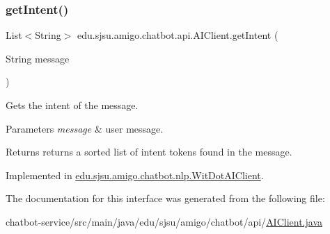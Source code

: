 \subsubsection{\texorpdfstring{get\+Intent()}{getIntent()}}
{\footnotesize\ttfamily List$<$String$>$ edu.\+sjsu.\+amigo.\+chatbot.\+api.\+A\+I\+Client.\+get\+Intent (\begin{DoxyParamCaption}\item[{String}]{message }\end{DoxyParamCaption})}

Gets the intent of the message.


\begin{DoxyParams}{Parameters}
{\em message} & user message. \\
\hline
\end{DoxyParams}
\begin{DoxyReturn}{Returns}
returns a sorted list of intent tokens found in the message. 
\end{DoxyReturn}


Implemented in \hyperlink{classedu_1_1sjsu_1_1amigo_1_1chatbot_1_1nlp_1_1_wit_dot_a_i_client_aa0e6e4f924089e29165ec44f7b7f54ee}{edu.\+sjsu.\+amigo.\+chatbot.\+nlp.\+Wit\+Dot\+A\+I\+Client}.



The documentation for this interface was generated from the following file\+:\begin{DoxyCompactItemize}
\item 
chatbot-\/service/src/main/java/edu/sjsu/amigo/chatbot/api/\hyperlink{_a_i_client_8java}{A\+I\+Client.\+java}\end{DoxyCompactItemize}
